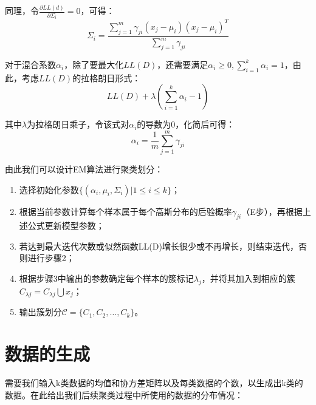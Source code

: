 \documentclass[12pt]{article}
\begin{document}
同理，令$\frac{\partial LL(d)}{\partial \varSigma_i}=0$，可得：
\[\varSigma_i=\frac{\sum\limits_{j=1}^m\gamma_{ji}(x_j-\mu_i)(x_j-\mu_i)^T}{\sum\limits_{j=1}^{m}\gamma_{ji}}\]\par
对于混合系数$\alpha_i$，除了要最大化$LL(D)$，还需要满足$\alpha_i\geq0,\sum\limits_{i=1}^{k}\alpha_i=1$，由此，考虑$LL(D)$的拉格朗日形式：
\[LL(D)+\lambda(\sum\limits_{i=1}^k\alpha_i-1)\]\par
其中$\lambda$为拉格朗日乘子，令该式对$\alpha_i$的导数为0，化简后可得：
\[\alpha_i=\frac{1}{m}\sum\limits_{j=1}^m\gamma_{ji}\]\par
由此我们可以设计EM算法进行聚类划分：
\begin{enumerate}
    \item 选择初始化参数$\{(\alpha_i,\mu_i,\varSigma_i)|1\leq i \leq k\}$；
    \item 根据当前参数计算每个样本属于每个高斯分布的后验概率$\gamma_{ji}$（E步），再根据上述公式更新模型参数；
    \item 若达到最大迭代次数或似然函数LL(D)增长很少或不再增长，则结束迭代，否则进行步骤2；
    \item 根据步骤3中输出的参数确定每个样本的簇标记$\lambda_j$，并将其加入到相应的簇$C_{\lambda j}=C_{\lambda j}\bigcup{x_j}$；
    \item 输出簇划分$\mathcal{C}=\{C_1,C_2,\dots,C_k\}$。
\end{enumerate}
\section{数据的生成}
需要我们输入k类数据的均值和协方差矩阵以及每类数据的个数，以生成出k类的数据。在此给出我们后续聚类过程中所使用的数据的分布情况：
\begin{figure}[H]
    \centering
\end{figure}
\end{document}
